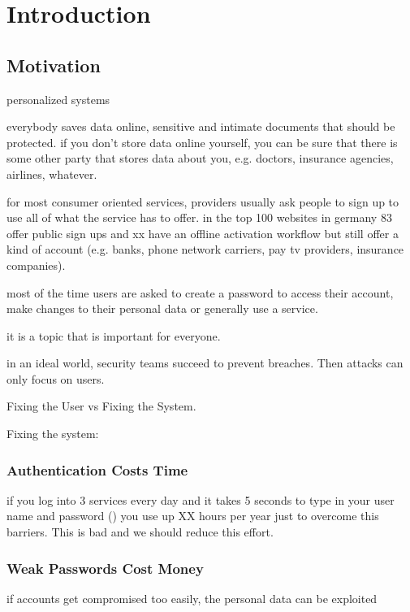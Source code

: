 
\chapter[Introduction]{Introduction}\label{chap:intro}


\section{Motivation}
personalized systems

everybody saves data online, sensitive and intimate documents that should be protected.
if you don't store data online yourself, you can be sure that there is some other party
that stores data about you, e.g. doctors, insurance agencies, airlines, whatever. 

for most consumer oriented services, providers usually ask people to sign up to use
all of what the service has to offer. in the top 100 websites in germany 83 offer public sign ups and xx have an offline activation workflow but still offer a kind of account (e.g. banks, phone network carriers, pay tv providers, insurance companies). 

most of the time users are asked to create a password to access their account, make changes to their personal data or generally use a service. 

it is a topic that is important for everyone. 

in an ideal world, security teams succeed to prevent breaches. Then attacks can only focus on users. 

Fixing the User vs Fixing the System. 

Fixing the system: \cite{Schmidt2013Pitfalls}

\subsection{Authentication Costs Time}
if you log into 3 services every day and it takes 5 seconds to type in your user name and password (\ar) you use up XX hours per year just to overcome this barriers. This is bad and we should reduce this effort. 


\subsection{Weak Passwords Cost Money}
if accounts get compromised too easily, the personal data can be exploited 

